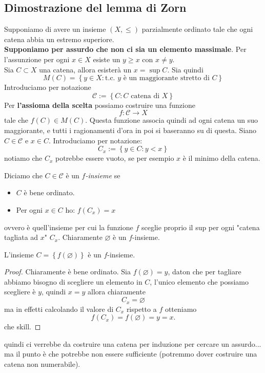 \documentclass[11pt]{scrartcl}
\newcommand{\eset}{\varnothing}
\begin{document}
  \subsection{Dimostrazione del lemma di Zorn}
  Supponiamo di avere un insieme $(X,\le)$ parzialmente ordinato tale che ogni catena abbia un estremo superiore. \\
  \textbf{Supponiamo per assurdo che non ci sia un elemento massimale}. Per l'assunzione per ogni $x\in X$ esiste un $y\ge x$ con $x\ne y$. \\
  Sia $C\subset X$ una catena, allora esisterà un $x=\sup C$. Sia quindi 
  $$M(C)=\left\{y\in X: \text{t.c. $y$ è un maggiorante stretto di $C$} \right\}$$
  Introduciamo per notazione
  $$\mathcal{C}:=\left\{C:C\text{ catena di }X\right\}$$
  Per \textbf{l'assioma della scelta} possiamo costruire una funzione
  $$f:\mathcal{C}\to X$$
  tale che $f(C)\in M(C)$. Questa funzione associa quindi ad ogni catena un suo maggiorante, e tutti i ragionamenti d'ora in poi si baseranno su di questa. Siano $C\in\mathcal{C}$ e $x\in C$. Introduciamo per notazione:
  $$C_x:=\left\{y\in C:y<x\right\}$$
  notiamo che $C_x$ potrebbe essere vuoto, se per esempio $x$ è il minimo della catena. 
  \begin{definition}[$f$-insieme]
  	Diciamo che $C\in\mathcal{C}$ è un \textit{$f$-insieme} se 
  	\begin{itemize}
  		\item $C$ è bene ordinato.
  		\item Per ogni $x\in C$ ho: $f(C_x)=x$
  	\end{itemize}
  	ovvero è quell'insieme per cui la funzione $f$ sceglie proprio il sup per ogni "catena tagliata ad $x$" $C_x$. Chiaramente $\eset$ è un $f$-insieme. 
  \end{definition}
  \begin{claim}
  	L'insieme $C=\left\{f(\eset)\right\}$ è un $f$-insieme.
  \end{claim}
  \begin{proof}
  	Chiaramente è bene ordinato. Sia $f(\eset)=y$, daton che per tagliare abbiamo bisogno di scegliere un elemento in $C$, l'unico elemento che possiamo scegliere è $y$, quindi $x=y$ allora chiaramente
  	$$C_x=\eset$$
  	ma in effetti calcolando il valore di $C_x$ rispetto a $f$ otteniamo
  	$$f(C_x)=f(\eset)=y=x.$$
  	che skill.
  \end{proof}
  quindi ci verrebbe da costruire una catena per induzione per cercare un assurdo... ma il punto è che potrebbe non essere sufficiente (potremmo dover costruire una catena non numerabile).
\end{document}
